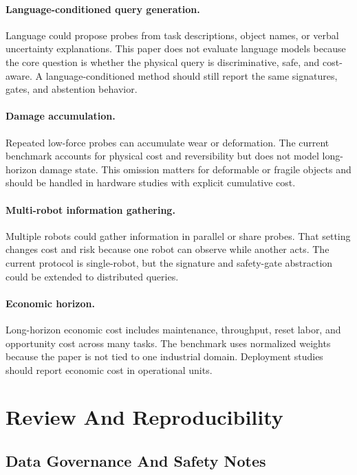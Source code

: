 \documentclass{article}
\begin{document}
\paragraph{Language-conditioned query generation.}
Language could propose probes from task descriptions, object names, or verbal uncertainty explanations. This paper does not evaluate language models because the core question is whether the physical query is discriminative, safe, and cost-aware. A language-conditioned method should still report the same signatures, gates, and abstention behavior.

\paragraph{Damage accumulation.}
Repeated low-force probes can accumulate wear or deformation. The current benchmark accounts for physical cost and reversibility but does not model long-horizon damage state. This omission matters for deformable or fragile objects and should be handled in hardware studies with explicit cumulative cost.

\paragraph{Multi-robot information gathering.}
Multiple robots could gather information in parallel or share probes. That setting changes cost and risk because one robot can observe while another acts. The current protocol is single-robot, but the signature and safety-gate abstraction could be extended to distributed queries.

\paragraph{Economic horizon.}
Long-horizon economic cost includes maintenance, throughput, reset labor, and opportunity cost across many tasks. The benchmark uses normalized weights because the paper is not tied to one industrial domain. Deployment studies should report economic cost in operational units.

\section{Review And Reproducibility}

\subsection{Data Governance And Safety Notes}
\end{document}
